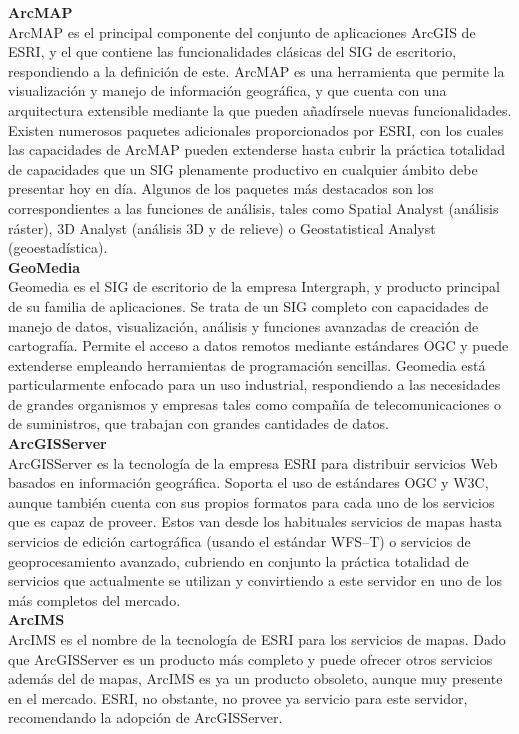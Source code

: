 \documentclass[12pt]{report}
\begin{document}
{{{{{{{{{{{{{{{				
				{\bf{ArcMAP}}\\
				ArcMAP es el principal componente del conjunto de aplicaciones ArcGIS de ESRI, y el que contiene las funcionalidades clásicas del SIG de escritorio, respondiendo a la definición de este. ArcMAP es una herramienta que permite la visualización y manejo de información geográfica, y que cuenta con una arquitectura extensible mediante la que pueden añadírsele nuevas funcionalidades. Existen numerosos paquetes adicionales proporcionados por ESRI, con los cuales las capacidades de ArcMAP pueden extenderse hasta cubrir la práctica totalidad de capacidades que un SIG plenamente productivo en cualquier ámbito debe presentar hoy en día. Algunos de los paquetes más destacados son los correspondientes a las funciones de análisis, tales como Spatial Analyst (análisis ráster), 3D Analyst (análisis 3D y de relieve) o Geostatistical Analyst (geoestadística).\\
				
				{\bf{GeoMedia}}\\
				Geomedia es el SIG de escritorio de la empresa Intergraph, y producto principal de su familia de aplicaciones. Se trata de un SIG completo con capacidades de manejo de datos, visualización, análisis y funciones avanzadas de creación de cartografía. Permite el acceso a datos remotos mediante estándares OGC y puede extenderse empleando herramientas de programación sencillas. Geomedia está particularmente enfocado para un uso industrial, respondiendo a las necesidades de grandes organismos y empresas tales como compañía de telecomunicaciones o de suministros, que trabajan con grandes cantidades de datos.\\
				
				{\bf{ArcGISServer}}\\
				ArcGISServer es la tecnología de la empresa ESRI para distribuir servicios Web basados en información geográfica. Soporta el uso de estándares OGC y W3C, aunque también cuenta con sus propios formatos para cada uno de los servicios que es capaz de proveer. Estos van desde los habituales servicios de mapas hasta servicios de edición cartográfica (usando el estándar WFS–T) o servicios de geoprocesamiento avanzado, cubriendo en conjunto la práctica totalidad de servicios que actualmente se utilizan y convirtiendo a este servidor en uno de los más completos del mercado.\\
				
				{\bf{ArcIMS}}\\
				ArcIMS es el nombre de la tecnología de ESRI para los servicios de mapas. Dado que ArcGISServer es un producto más completo y puede ofrecer otros servicios además del de mapas, ArcIMS es ya un producto obsoleto, aunque muy presente en el mercado. ESRI, no obstante, no provee ya servicio para este servidor, recomendando la adopción de ArcGISServer.\\
				
}}}}}}}}}}}}}}}
\end{document}
